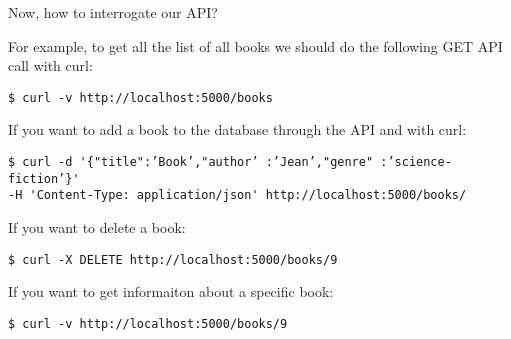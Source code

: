 \documentclass{beamer}[10pt, usepdftitle=false handout]
\begin{document}
\begin{frame}[fragile]
Now, how to interrogate our API?
\vspace*{0.6em}

For example, to get all the list of all books we should do the following GET API call with curl:
\vspace*{0.6em}

\begin{verbatim}
$ curl -v http://localhost:5000/books
\end{verbatim}

If you want to add a book to the database through the API and with curl:
\vspace*{0.6em}

\begingroup
\fontsize{6pt}{8pt}\selectfont
\begin{verbatim}
$ curl -d '{"title":’Book’,"author’ :’Jean’,"genre" :’science-fiction’}' 
-H 'Content-Type: application/json' http://localhost:5000/books/
\end{verbatim}
\endgroup

If you want to delete a book:
\vspace*{0.6em}

\begin{verbatim}
$ curl -X DELETE http://localhost:5000/books/9
\end{verbatim}

If you want to get informaiton about a specific book:
\vspace*{0.6em}
\begin{verbatim}
$ curl -v http://localhost:5000/books/9
\end{verbatim}
\end{frame}
\end{document}
